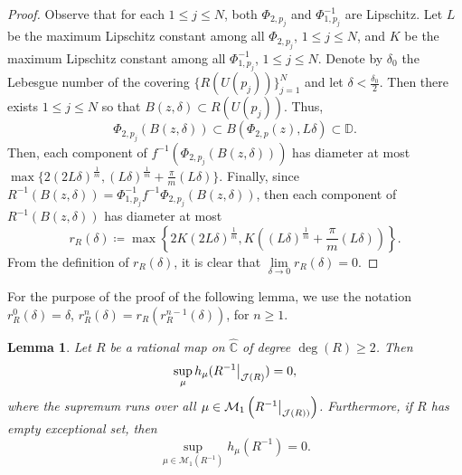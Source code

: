 \documentclass[11pt,letterpaper]{article}
\newtheorem{lemma}[theorem]{Lemma}
\theoremstyle{definition}
\newcommand\restr[2]{{%
  \left.\kern-\nulldelimiterspace %
  #1 %
  \vphantom{\big|} %
  \right|_{#2} %
  }}
\begin{document}
\begin{proof}
Observe that for each $1\leq j\leq N$, both $\Phi_{2,p_j}$ and $\Phi_{1,p_j}^{-1}$ are Lipschitz. Let $L$ be the maximum Lipschitz constant among all $\Phi_{2,p_j}$, $1\leq j\leq N$, and $K$ be the maximum Lipschitz constant among all $\Phi_{1,p_j}^{-1}$, $1\leq j\leq N$. Denote by $\delta_0$ the Lebesgue number of the covering $\lbrace R(U(p_j))\rbrace_{j=1}^N$ and let $\delta<\frac{\delta_0}{2}$. Then there exists $1\leq j\leq N$ so that $B(z,\delta)\subset R(U(p_j))$. Thus,
$$\Phi_{2,p_j}(B(z,\delta))\subset B(\Phi_{2,p}(z),L\delta)\subset\mathbb{D}.$$
Then, each component of $f^{-1}(\Phi_{2,p_j}(B(z,\delta)))$ has diameter at most $\max\lbrace 2(2L\delta)^{\frac{1}{m}},(L\delta)^{\frac{1}{m}}+\frac{\pi}{m}(L\delta)\rbrace$. Finally, since $R^{-1}(B(z,\delta))=\Phi_{1,p_j}^{-1}f^{-1}\Phi_{2,p_j}(B(z,\delta))$, then each component of $R^{-1}(B(z,\delta))$ has diameter at most
$$r_R(\delta)\coloneqq\max\left\lbrace 2K(2L\delta)^{\frac{1}{m}},K((L\delta)^{\frac{1}{m}}+\dfrac{\pi}{m}(L\delta))\right\rbrace.$$
From the definition of $r_R(\delta)$, it is clear that $\lim\limits_{\delta\to 0}r_R(\delta)=0$. 
\end{proof}

For the purpose of the proof of the following lemma, we use the notation $r_R^0(\delta)=\delta$, $r_R^n(\delta)=r_R(r_R^{n-1}(\delta))$, for $n\geq 1$.

\begin{lemma}\label{rational}
Let $R$ be a rational map on $\widehat{\mathbb{C}}$ of degree $\operatorname{deg}(R)\geq 2$. Then 
$$\sup\limits_{\mu}h_\mu(\restr{R^{-1}}{\mathcal{J}(R)})=0,$$
where the supremum runs over all $\mu\in\mathcal{M}_1\left(\restr{R^{-1}}{\mathcal{J}(R))}\right)$. Furthermore, if $R$ has empty exceptional set, then
$$\sup\limits_{\mu\in\mathcal{M}_1(R^{-1})}h_{\mu}(R^{-1})=0.$$
\end{lemma}
\end{document}
